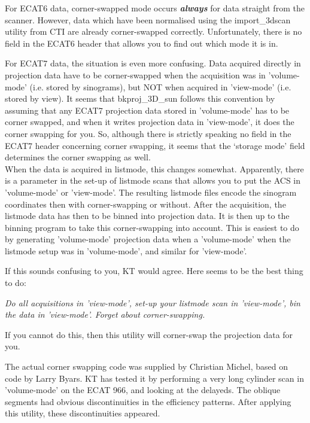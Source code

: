 \documentclass{article}
\begin{document}
For ECAT6 data, corner-swapped mode occurs \textbf{\textit{always}} for 
data straight from the scanner. However, data which have been 
normalised using the import\_3dscan utility from CTI are already 
corner-swapped correctly. Unfortunately, there is no field in 
the ECAT6 header that allows you to find out which mode it is 
in.



For ECAT7 data, the situation is even more confusing. Data acquired 
directly in projection data have to be corner-swapped when the 
acquisition was in 'volume-mode' (i.e. stored by sinograms), 
but NOT when acquired in 'view-mode' (i.e. stored by view). It 
seems that bkproj\_3D\_sun follows this convention by assuming 
that any ECAT7 projection data stored in 'volume-mode' has to 
be corner swapped, and when it writes projection data in 'view-mode', 
it does the corner swapping for you. So, although there is strictly 
speaking no field in the ECAT7 header concerning corner swapping, 
it seems that the `storage mode' field determines the corner swapping 
as well.\\
When the data is acquired in listmode, this changes somewhat. 
Apparently, there is a parameter in the set-up of listmode scans 
that allows you to put the ACS in 'volume-mode' or 'view-mode'. 
The resulting listmode files encode the sinogram coordinates 
then with corner-swapping or without. After the acquisition, 
the listmode data has then to be binned into projection data. 
It is then up to the binning program to take this corner-swapping 
into account. This is easiest to do by generating 'volume-mode' 
projection data when a 'volume-mode' when the listmode setup 
was in 'volume-mode', and similar for 'view-mode'.


If this sounds confusing to you, KT would agree. Here seems to 
be the best thing to do:


\textit{Do all acquisitions in 'view-mode', set-up your listmode 
scan in 'view-mode', bin the data in 'view-mode'. Forget about 
corner-swapping.}


If you cannot do this, then this utility will corner-swap the 
projection data for you.

{ 
}

The actual corner swapping code was supplied by Christian Michel, 
based on code by Larry Byars. KT has tested it by performing 
a very long cylinder scan in 'volume-mode' on the ECAT 966, and 
looking at the delayeds. The oblique segments had obvious discontinuities 
in the efficiency patterns. After applying this utility, these 
discontinuities appeared.
\end{document}
